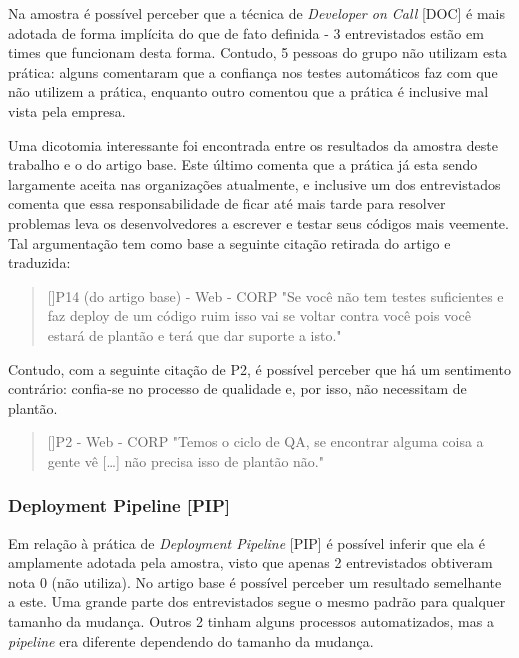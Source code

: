 Na amostra é possível perceber que a técnica de \emph{Developer on Call} [DOC] é mais adotada de forma implícita do que de fato definida - 3 entrevistados estão em times que funcionam desta forma. Contudo, 5 pessoas do grupo não utilizam esta prática: alguns comentaram que a confiança nos testes automáticos faz com que não utilizem a prática, enquanto outro comentou que a prática é inclusive mal vista pela empresa.

Uma dicotomia interessante foi encontrada entre os resultados da amostra deste trabalho e o do artigo base. Este último comenta que a prática já esta sendo largamente aceita nas organizações atualmente, e inclusive um dos entrevistados comenta que essa responsabilidade de ficar até mais tarde para resolver problemas leva os desenvolvedores a escrever e testar seus códigos mais veemente. Tal argumentação tem como base a seguinte citação retirada do artigo e traduzida:

\begin{quotation}[]{P14 (do artigo base) - Web - CORP}
    "Se você não tem testes suficientes e faz deploy de um código ruim isso vai se voltar contra você pois você estará de plantão e terá que dar suporte a isto."
\end{quotation}

Contudo, com a seguinte citação de P2, é possível perceber que há um sentimento contrário: confia-se no processo de qualidade e, por isso, não necessitam de plantão.

\vspace{5mm}

\begin{quotation}[]{P2 - Web - CORP}
    "Temos o ciclo de QA, se encontrar alguma coisa a gente vê […] não precisa isso de plantão não." 
\end{quotation}

\subsubsection{Deployment Pipeline [PIP]}

Em relação à prática de \emph{Deployment Pipeline} [PIP] é possível inferir que ela é amplamente adotada pela amostra, visto que apenas 2 entrevistados obtiveram nota 0 (não utiliza). No artigo base é possível perceber um resultado semelhante a este. Uma grande parte dos entrevistados segue o mesmo padrão para qualquer tamanho da mudança. Outros 2 tinham alguns processos automatizados, mas a \emph{pipeline} era diferente dependendo do tamanho da mudança.

